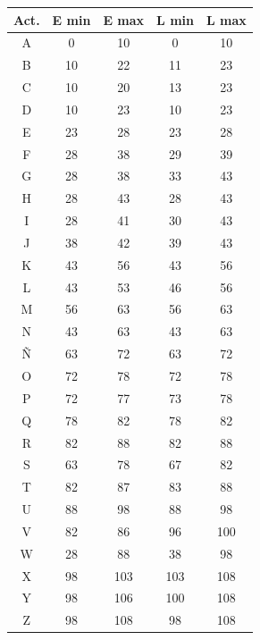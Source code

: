 \documentclass[]{article}
\begin{document}
\begin{table}[ht]
\centering
\begin{tabular}{|c|c|c|c|c|}
\hline
Act. & E min & E max & L min & L max \\ \hline
A    & 0     & 10    & 0     & 10    \\ \hline
B    & 10    & 22    & 11    & 23    \\ \hline
C    & 10    & 20    & 13    & 23    \\ \hline
D    & 10    & 23    & 10    & 23    \\ \hline
E    & 23    & 28    & 23    & 28    \\ \hline
F    & 28    & 38    & 29    & 39    \\ \hline
G    & 28    & 38    & 33    & 43    \\ \hline
H    & 28    & 43    & 28    & 43    \\ \hline
I    & 28    & 41    & 30    & 43    \\ \hline
J    & 38    & 42    & 39    & 43    \\ \hline
K    & 43    & 56    & 43    & 56    \\ \hline
L    & 43    & 53    & 46    & 56    \\ \hline
M    & 56    & 63    & 56    & 63    \\ \hline
N    & 43    & 63    & 43    & 63    \\ \hline
Ñ    & 63    & 72    & 63    & 72    \\ \hline
O    & 72    & 78    & 72    & 78    \\ \hline
P    & 72    & 77    & 73    & 78    \\ \hline
Q    & 78    & 82    & 78    & 82    \\ \hline
R    & 82    & 88    & 82    & 88    \\ \hline
S    & 63    & 78    & 67    & 82    \\ \hline
T    & 82    & 87    & 83    & 88    \\ \hline
U    & 88    & 98    & 88    & 98    \\ \hline
V    & 82    & 86    & 96    & 100   \\ \hline
W    & 28    & 88    & 38    & 98    \\ \hline
X    & 98    & 103   & 103   & 108   \\ \hline
Y    & 98    & 106   & 100   & 108   \\ \hline
Z    & 98    & 108   & 98    & 108   \\ \hline
\end{tabular}
\end{table}
\end{document}

